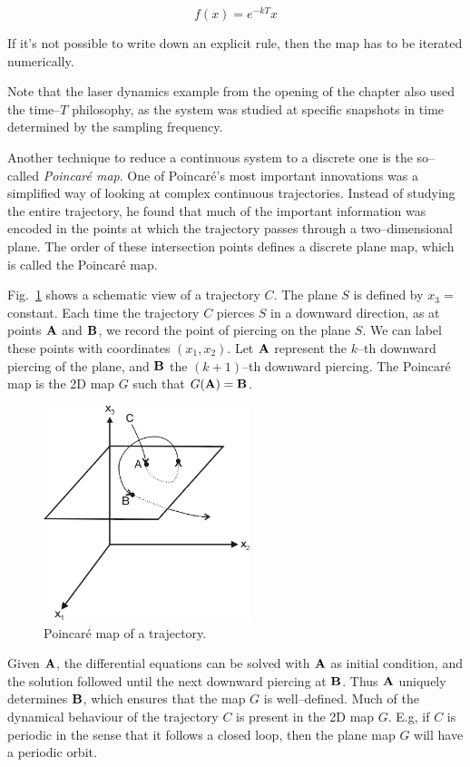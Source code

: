 \begin{equation}
f(x) = e^{-kT} x
\end{equation} 

If it's not possible to write down an explicit rule, then the map has to be iterated numerically.

Note that the laser dynamics example from the opening of the chapter also used the time--$T$ philosophy, as the system was studied at specific snapshots in time determined by the sampling frequency.

Another technique to reduce a continuous system to a discrete one is the so--called \emph{Poincar\'{e} map}. One of Poincar\'{e}'s most important innovations was a simplified way of looking at complex continuous trajectories. Instead of studying the entire trajectory, he found that much of the important information was encoded in the points at which the trajectory passes through a two--dimensional plane. The order of these intersection points defines a discrete plane map, which is called the Poincar\'{e} map. 

Fig.~\ref{fig-poincare} shows a schematic view of a trajectory $C$. The plane $S$ is defined by $x_3=$ constant. Each time the trajectory $C$ pierces $S$ in a downward direction, as at points ${\bf A}$ and ${\bf B}$, we record the point of piercing on the plane $S$. We can label these points with coordinates $(x_1,x_2)$. Let ${\bf A}$ represent the $k$--th downward piercing of the plane, and ${\bf B}$ the $(k+1)$--th downward piercing. The Poincar\'{e} map is the 2D map $G$ such that $G({\bf A}) = {\bf B}$.

\begin{figure}
\centering
\includegraphics[width=6cm]{dynamic/figures/poincare}
\caption{Poincar\'{e} map of a trajectory.}
\label{fig-poincare}
\end{figure} 

Given ${\bf A}$, the differential equations can be solved with ${\bf A}$ as initial condition, and the solution followed until the next downward piercing at ${\bf B}$. Thus ${\bf A}$ uniquely determines ${\bf B}$, which ensures that the map $G$ is well--defined. Much of the dynamical behaviour of the trajectory $C$ is present in the 2D map $G$. E.g, if $C$ is periodic in the sense that it follows a closed loop, then the plane map $G$ will have a periodic orbit.

